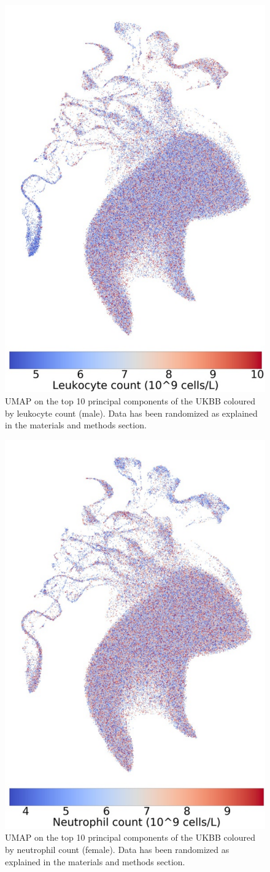 \documentclass[12pt]{pnas-new}
\begin{document}
\begin{figure}
    \centering
    \includegraphics[width=0.4\columnwidth]{images/UKBB_UMAP_PC10_NN15_MD05_2018328174511_201871416519_leukocyte_count_pct5_m.pdf}
    \caption{UMAP on the top 10 principal components of the UKBB coloured by leukocyte count (male). Data has been randomized as explained in the materials and methods section.}
    \label{fig:supp_ukbb_leukocyte_m}
\end{figure}

\begin{figure}
    \centering
    \includegraphics[width=0.4\columnwidth]{images/UKBB_UMAP_PC10_NN15_MD05_2018328174511_2018714165614_neutrophill_count_pct5_f.pdf}
    \caption{UMAP on the top 10 principal components of the UKBB coloured by neutrophil count (female). Data has been randomized as explained in the materials and methods section.}
    \label{fig:supp_ukbb_neutrophill_f}
\end{figure}
\end{document}
